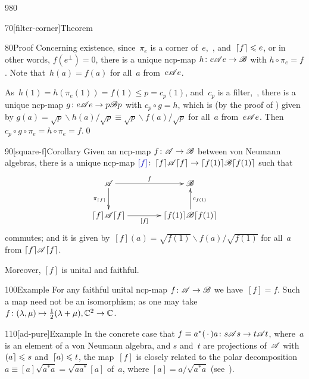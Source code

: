 \begin{parsec}{980}
\begin{point}{70}[filter-corner]{Theorem}
\begin{point}{80}{Proof}
Concerning existence, 
since~$\pi_e$ is a corner of~$e$,~,
and~$\left\lceil f\right\rceil\leqslant e$,
or in other words, $f(e^\perp)=0$,
there is a unique ncp-map $h\colon e\mathscr{A} e\to \mathscr{B}$
with $h \circ \pi_e = f$.
Note that~$h(a)=f(a)$ for all~$a$ from~$e\mathscr{A} e$.

As~$h(1)=h(\pi_e(1))=f(1)\leq p=c_p(1)$,
and~$c_p$ is a filter,~,
there is a unique ncp-map
$g\colon e\mathscr{A} e \to p \mathscr{B} p$
with $c_p\circ g = h$,
which is (by the proof of ) given by
$g(a)=\sqrt{p}\backslash h(a)/\sqrt{p}
\equiv \sqrt{p}\backslash f(a)/\sqrt{p}$
for all~$a$ from~$e\mathscr{A} e$.
Then~$c_p\circ g\circ \pi_e = h\circ \pi_e = f$.\qed
\end{point}
\end{point}
\begin{point}{90}[square-f]{Corollary}%
Given an ncp-map $f\colon \mathscr{A}\to\mathscr{B}$
between von Neumann algebras,
there is a unique ncp-map $\Define{[f]}\colon 
\ceil{f}\!\scrA\!\ceil{f}
\to
\ceil{f(1)}\!\scrB\!\ceil{f(1)}$%
such that 
\begin{equation*}
\xymatrix@C=4em{
\scrA
\ar[r]^-f
\ar[d]_{\pi_{\ceil{f}}}
&
\scrB
\\
\ceil{f}\!\scrA\!\ceil{f}
\ar[r]_-{[f]}
& 
\ceil{f(1)}\!\scrB\!\ceil{f(1)}
\ar[u]_{c_{f(1)}}
}
\end{equation*}
commutes;
and it is given by~$[f](a)=\sqrt{f(1)}\backslash f(a)/\!\sqrt{f(1)}$
for all~$a$ from $\left\lceil f\right\rceil\!\mathscr{A}\!\left\lceil f\right\rceil$.

Moreover, 
$[f]$ is unital and faithful.
\end{point}
\begin{point}{100}{Example}%
For any faithful unital ncp-map $f\colon \mathscr{A}\to \mathscr{B}$
we have~$[f]=f$.
Such a map need not be an isomorphism;
	as one may take $f\colon (\lambda,\mu)\mapsto \frac{1}{2}(\lambda+\mu),
\mathbb{C}^2\to\mathbb{C}$.
\end{point}
\begin{point}{110}[ad-pure]{Example}%
In the concrete case
that $f\equiv a^*(\,\cdot\,)a \colon
s\mathscr{A} s\to t\mathscr{A} t$,
where~$a$ is an element
of a von Neumann algebra,
and $s$ and~$t$ are projections of~$\mathscr{A}$
with
$\left(a\right\rceil\leqslant s$
and~$\left\lceil a\right)\leqslant t$,
the map~$[f]$ 
is closely related to the
polar decomposition $a\equiv [a]\sqrt{a^*a}
= \sqrt{aa^*}[a]$ of~$a$,
where $[a]=a/\sqrt{a^*a}$
(see~).


\end{point}
\end{parsec}
